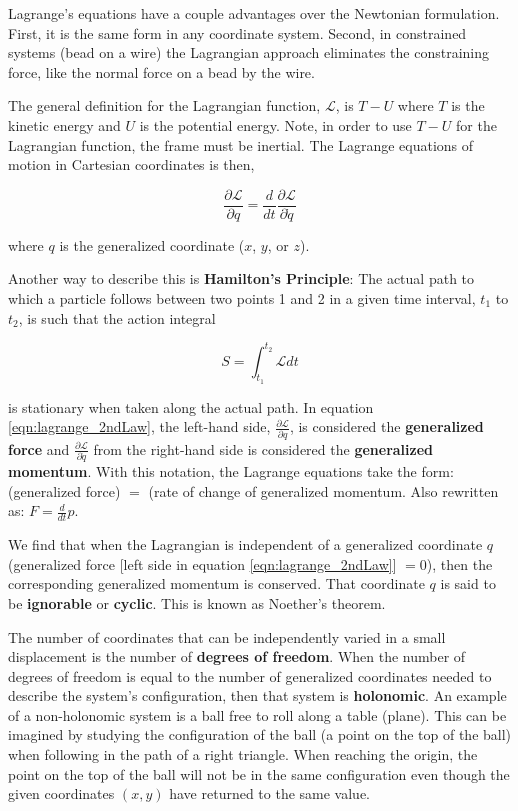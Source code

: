 Lagrange's equations have a couple advantages over the Newtonian formulation. First, it is the same form in any coordinate system. Second, in constrained systems (bead on a wire) the Lagrangian approach eliminates the constraining force, like the normal force on a bead by the wire.

The general definition for the Lagrangian function, $\mathcal{L}$, is $T-U$ where $T$ is the kinetic energy and $U$ is the potential energy. Note, in order to use $T-U$ for the Lagrangian function, the frame must be inertial. The Lagrange equations of motion in Cartesian coordinates is then,

\begin{equation}
    \frac{\partial \mathcal{L}}{\partial q} = \frac{d}{dt} \frac{\partial \mathcal{L}}{\partial \dot{q}}
    \label{eqn:lagrange_2ndLaw}
\end{equation}

\noindent where $q$ is the generalized coordinate ($x$, $y$, or $z$).

Another way to describe this is {\bfseries Hamilton's Principle}: The actual path to which a particle follows between two points 1 and 2 in a given time interval, $t_1$ to $t_2$, is such that the action integral

\begin{equation*}
    S = \int_{t_1}^{t_2} \mathcal{L} dt
\end{equation*}

\noindent is stationary when taken along the actual path. In equation \ref{eqn:lagrange_2ndLaw}, the left-hand side, $\frac{\partial \mathcal{L}}{\partial q}$, is considered the {\bfseries generalized force} and $\frac{\partial \mathcal{L}}{\partial \dot{q}}$ from the right-hand side is considered the {\bfseries generalized momentum}. With this notation, the Lagrange equations take the form: (generalized force) $=$ (rate of change of generalized momentum. Also rewritten as: $F=\frac{d}{dt}p$.

We find that when the Lagrangian is independent of a generalized coordinate $q$ (generalized force [left side in equation \ref{eqn:lagrange_2ndLaw}] $=0$), then the corresponding generalized momentum is conserved. That coordinate $q$ is said to be {\bfseries ignorable} or {\bfseries cyclic}. This is known as Noether's theorem.

The number of coordinates that can be independently varied in a small displacement is the number of {\bfseries degrees of freedom}. When the number of degrees of freedom is equal to the number of generalized coordinates needed to describe the system's configuration, then that system is {\bfseries holonomic}. An example of a non-holonomic system is a ball free to roll along a table (plane). This can be imagined by studying the configuration of the ball (a point on the top of the ball) when following in the path of a right triangle. When reaching the origin, the point on the top of the ball will not be in the same configuration even though the given coordinates $(x,y)$ have returned to the same value.

